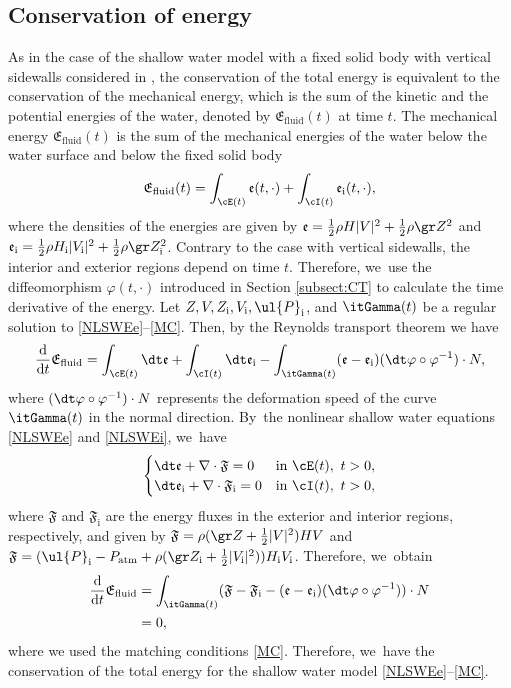 \subsection{Conservation of energy}\label{sectconsNRJ}
As in the case of the shallow water model with a fixed solid body with vertical sidewalls considered in \cite{IguchiLannes2023},
the conservation of the total energy is equivalent to the conservation of the mechanical energy,
which is the sum of the kinetic and the potential energies of the water, denoted by $\mathfrak{E}_\mathrm{fluid}(t)$ at time $t$.
The mechanical energy $\mathfrak{E}_\mathrm{fluid}(t)$ is the sum of the mechanical energies of the water below the water surface and below the fixed solid body
\[
\mathfrak{E}_\mathrm{fluid}(t) = \int_{\cE(t)}\mathfrak{e}(t,\cdot) + \int_{\cI(t)}\mathfrak{e}_\mathrm{i}(t,\cdot),
\]
where the densities of the energies are given by $\mathfrak{e} = \frac12\rho H|V|^2 + \frac12\rho\gr Z^2$
and $\mathfrak{e}_\mathrm{i} = \frac12\rho H_\mathrm{i}|V_\mathrm{i}|^2+\frac12\rho\gr Z_\mathrm{i}^2$.
Contrary to the case with vertical sidewalls, the interior and exterior regions depend on time $t$.
Therefore, we~use the diffeomorphism $\varphi(t,\cdot)$ introduced in Section \ref{subsect:CT} to calculate the time derivative of the energy.
Let $Z,V,Z_\mathrm{i},V_\mathrm{i},\ul{P}_\mathrm{i}$, and $\itGamma(t)$ be a regular solution to \eqref{NLSWEe}--\eqref{MC}.
Then, by the Reynolds transport theorem we have
\[
\frac{\rm d}{{\rm d}t}\mathfrak{E}_\mathrm{fluid}
= \int_{\cE(t)}\dt\mathfrak{e} + \int_{\cI(t)}\dt\mathfrak{e}_\mathrm{i} - \int_{\itGamma(t)}(\mathfrak{e}-\mathfrak{e}_\mathrm{i})(\dt\varphi\circ\varphi^{-1})\cdot N,
\]
where $(\dt\varphi\circ\varphi^{-1})\cdot N$ represents the deformation speed of the curve $\itGamma(t)$ in the normal direction. By~the nonlinear shallow water equations \eqref{NLSWEe} and \eqref{NLSWEi}, we~have
\[
\begin{cases}
\dt\mathfrak{e} + \nabla\cdot\mathfrak{F} = 0 &\text{in } \cE(t), \ t>0, \\
\dt\mathfrak{e}_\mathrm{i} + \nabla\cdot\mathfrak{F}_\mathrm{i} = 0 &\text{in } \cI(t), \ t>0,
\end{cases}
\]
where $\mathfrak{F}$ and $\mathfrak{F}_\mathrm{i}$ are the energy fluxes in the exterior and interior regions, respectively, and given by
$\mathfrak{F}=\rho(\gr Z+\frac12|V|^2)HV$ and $\mathfrak{F}=(\ul{P}_\mathrm{i}-P_\mathrm{atm}+\rho(\gr Z_\mathrm{i}+\frac12|V_\mathrm{i}|^2))H_\mathrm{i}V_\mathrm{i}$.
Therefore, we~obtain
\begin{align*}
\frac{\rm d}{{\rm d}t}\mathfrak{E}_\mathrm{fluid}
&= \int_{\itGamma(t)}(\mathfrak{F}-\mathfrak{F}_\mathrm{i}-(\mathfrak{e}-\mathfrak{e}_\mathrm{i})(\dt\varphi\circ\varphi^{-1}))\cdot N \\
&= 0,
\end{align*}
where we used the matching conditions \eqref{MC}.
Therefore, we~have the conservation of the total energy for the shallow water model \eqref{NLSWEe}--\eqref{MC}.


